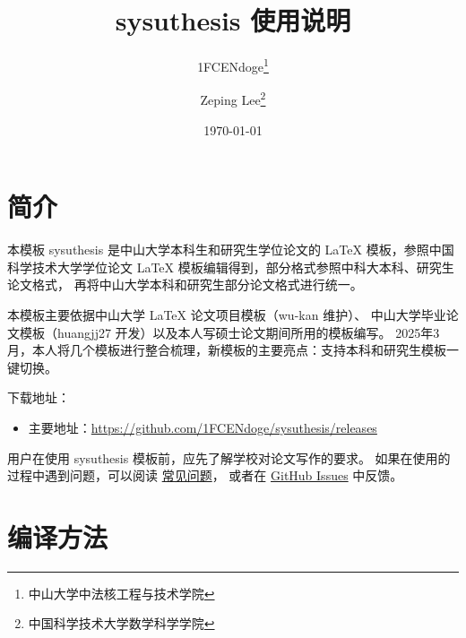 \documentclass[a4paper]{ltxdoc}
\DeclareRobustCommand\pkg{\textsf}
\DeclareRobustCommand\cls{\textsf}
\begin{document}
\title{\cls{sysuthesis} 使用说明}
\author{1FCENdoge\thanks{中山大学中法核工程与技术学院}\and Zeping Lee\thanks{中国科学技术大学数学科学学院} }
\date{\today}
\maketitle



\section{简介}

本模板 \cls{sysuthesis} 是中山大学本科生和研究生学位论文的 \LaTeX{}
模板，参照中国科学技术大学学位论文 \LaTeX{}
模板编辑得到，部分格式参照中科大本科、研究生论文格式，
再将中山大学本科和研究生部分论文格式进行统一。

本模板主要依据中山大学 \LaTeX{} 论文项目模板（wu-kan 维护）、
中山大学毕业论文模板（huangjj27 开发）以及本人写硕士论文期间所用的模板编写。
2025年3月，本人将几个模板进行整合梳理，新模板的主要亮点：支持本科和研究生模板一键切换。

下载地址：
\begin{itemize}
  \item 主要地址：\url{https://github.com/1FCENdoge/sysuthesis/releases}
\end{itemize}

用户在使用 \pkg{sysuthesis} 模板前，应先了解学校对论文写作的要求。
如果在使用的过程中遇到问题，可以阅读
\href{https://github.com/ustctug/ustcthesis/wiki}{常见问题}，
或者在 \href{https://github.com/1FCENdoge/sysuthesis/issues}{GitHub Issues}
中反馈。



\section{编译方法}
\end{document}
